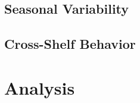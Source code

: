 \documentclass[11pt]{article}
\begin{document}
\subsection{Seasonal Variability}

\subsection{Cross-Shelf Behavior}

\section{Analysis}



\end{document}
